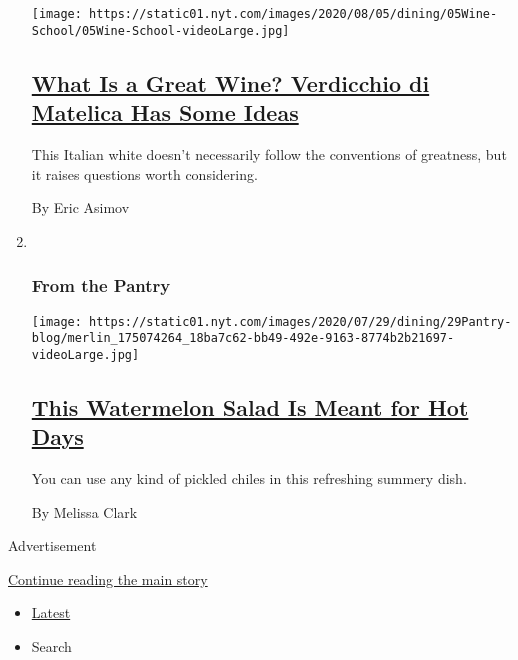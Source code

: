 \begin{enumerate}
  \texttt{[image: https://static01.nyt.com/images/2020/08/05/dining/05Wine-School/05Wine-School-videoLarge.jpg]}

  \hypertarget{what-is-a-great-wine-verdicchio-di-matelica-has-some-ideas}{%
  \subsection{\texorpdfstring{\href{/2020/07/30/dining/drinks/wine-school-verdicchio-di-matelica.html}{What
  Is a Great Wine? Verdicchio di Matelica Has Some
  Ideas}}{What Is a Great Wine? Verdicchio di Matelica Has Some Ideas}}\label{what-is-a-great-wine-verdicchio-di-matelica-has-some-ideas}}

  This Italian white doesn't necessarily follow the conventions of
  greatness, but it raises questions worth considering.

  By Eric Asimov
\item ~
  \hypertarget{from-the-pantry}{%
  \subsubsection{From the Pantry}\label{from-the-pantry}}

  \texttt{[image: https://static01.nyt.com/images/2020/07/29/dining/29Pantry-blog/merlin\_175074264\_18ba7c62-bb49-492e-9163-8774b2b21697-videoLarge.jpg]}

  \hypertarget{this-watermelon-salad-is-meant-for-hot-days}{%
  \subsection{\texorpdfstring{\href{/2020/07/29/dining/watermelon-salad-recipe.html}{This
  Watermelon Salad Is Meant for Hot
  Days}}{This Watermelon Salad Is Meant for Hot Days}}\label{this-watermelon-salad-is-meant-for-hot-days}}

  You can use any kind of pickled chiles in this refreshing summery
  dish.

  By Melissa Clark
\end{enumerate}

Advertisement

\protect\hyperlink{after-mid1}{Continue reading the main story}

\begin{itemize}
\tightlist
\item
  \protect\hyperlink{stream-panel}{Latest}
\item
  Search
\end{itemize}

